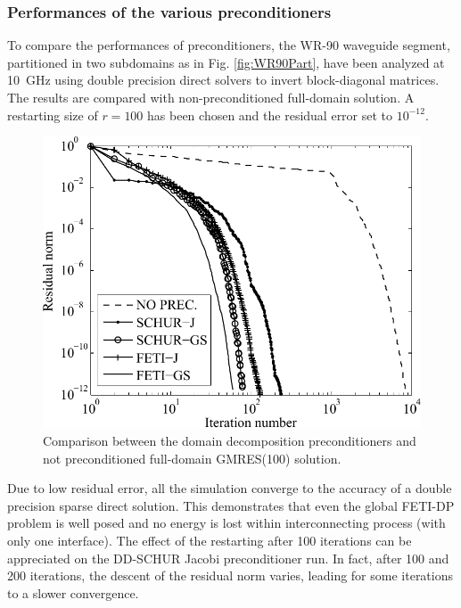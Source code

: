 \subsubsection{Performances of the various preconditioners}

To compare the performances of preconditioners, the WR-90 waveguide segment, partitioned in two subdomains as in Fig. \ref{fig:WR90Part}, have been analyzed at 10~GHz using double precision direct solvers to invert block-diagonal matrices. The results are compared with non-preconditioned full-domain solution. A restarting size of $r=100$ has been chosen and the residual error set to $10^{-12}$. 

\begin{figure}[h!]
\centering
\includegraphics[width=13.4cm]{GMREScomp}
\caption{Comparison between the domain decomposition preconditioners and not preconditioned full-domain GMRES(100) solution.}
\label{fig:GMREScomp}
\end{figure}

Due to low residual error, all the simulation converge to the accuracy of a double precision sparse direct solution. This demonstrates that even the global FETI-DP problem is well posed and no energy is lost within interconnecting process (with only one interface). The effect of the restarting after 100 iterations can be appreciated on the DD-SCHUR Jacobi preconditioner run. In fact, after 100 and 200 iterations, the descent of the residual norm varies, leading for some iterations to a slower convergence.

